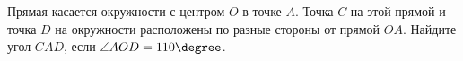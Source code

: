 \begin{ex}
	\begin{condition}
		Прямая касается окружности с центром \( O \) в точке \( A \).
		Точка \( C \) на этой прямой и точка \( D \) на окружности расположены по разные стороны от прямой \( OA \). Найдите угол \( CAD \), если \( \angle AOD = 110\degree \).
	\end{condition}
\end{ex}
